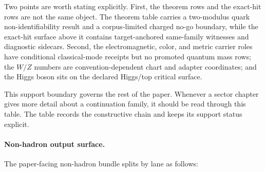 \documentclass[11pt]{article}
\begin{document}
Two points are worth stating explicitly. First, the theorem rows and the exact-hit rows are not
the same object. The theorem table carries a two-modulus quark non-identifiability result and a
corpus-limited charged no-go boundary, while the exact-hit surface above it contains target-anchored
same-family witnesses and diagnostic sidecars.
Second, the electromagnetic, color, and metric carrier
roles have conditional classical-mode receipts but no promoted quantum mass rows; the \(W/Z\)
numbers are convention-dependent chart and adapter coordinates; and the
Higgs boson sits on the declared Higgs/top critical surface.

This support boundary governs the rest of the paper. Whenever a sector chapter gives more
detail about a continuation family, it should be read through this table. The table records the
constructive chain and keeps its support status explicit.

\paragraph{Non-hadron output surface.}
The paper-facing non-hadron bundle splits by lane as follows:
\end{document}
